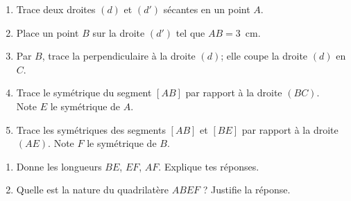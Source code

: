 \begin{myenumerate}
\item
\begin{enumerate}
\item Trace deux droites $(d)$ et $(d')$ sécantes en un point $A$.
\item Place un point $B$ sur la droite $(d')$ tel que $AB=3$~cm.
\item Par $B$, trace la perpendiculaire à la droite $(d)$; elle coupe
la droite $(d)$ en $C$.
\item Trace le symétrique du segment $[AB]$ par rapport à la droite
$(BC)$.\\Note $E$ le symétrique de $A$.
\item Trace les symétriques des segments $[AB]$ et $[BE]$ par rapport
à la droite $(AE)$. Note $F$ le symétrique de $B$.
\end{enumerate}
\item
\begin{enumerate}
\item Donne les longueurs $BE$, $EF$, $AF$. Explique tes réponses.
\item Quelle est la nature du quadrilatère $ABEF$ ? Justifie la réponse.
\end{enumerate}
\end{myenumerate}